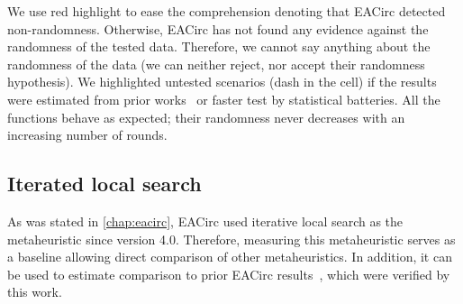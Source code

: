 \documentclass[
    digital,    %
    oneside,    %
    color,
    11pt,
    nocover,
    notable,
    nolof,
    nolot,
]{fithesis3}
\begin{document}
We use red highlight to ease the comprehension denoting that EACirc detected non-randomness. Otherwise, EACirc has not found any evidence against the randomness of the tested data. Therefore, we cannot say anything about the randomness of the data (we can neither reject, nor accept their randomness hypothesis). We highlighted untested scenarios (dash in the cell) if the results were estimated from prior works~\cite{svenda2013towards,sys2014constructing,kubicek2016new,ukropBcThesis} or faster test by statistical batteries. All the functions behave as expected; their randomness never decreases with an increasing number of rounds.

\subsection{Iterated local search}
\label{subsec:res-ss-ils}

As was stated in \cref{chap:eacirc}, EACirc used iterative local search as the metaheuristic since version 4.0. Therefore, measuring this metaheuristic serves as a baseline allowing direct comparison of other metaheuristics. In addition, it can be used to estimate comparison to prior EACirc results~\cite{svenda2013towards,sys2014constructing,kubicek2016new,ukropBcThesis}, which were verified by this work.
\end{document}
